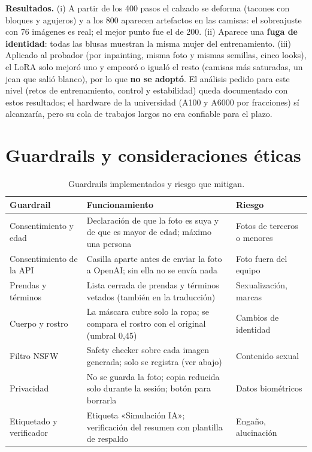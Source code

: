 \documentclass[11pt,letterpaper]{article}
\begin{document}
\textbf{Resultados.} (i) A partir de los 400 pasos el calzado se deforma (tacones con bloques y agujeros) y a los 800
aparecen artefactos en las camisas: el sobreajuste con 76 imágenes es real; el mejor punto fue el de 200. (ii) Aparece una
\textbf{fuga de identidad}: todas las blusas muestran la misma mujer del entrenamiento. (iii) Aplicado al probador (por
inpainting, misma foto y mismas semillas, cinco looks), el LoRA solo mejoró uno y empeoró o igualó el resto (camisas más
saturadas, un jean que salió blanco), por lo que \textbf{no se adoptó}. El análisis pedido para este nivel (retos de
entrenamiento, control y estabilidad) queda documentado con estos resultados; el hardware de la universidad (A100 y
A6000 por fracciones) sí alcanzaría, pero su cola de trabajos largos no era confiable para el plazo.

\section{Guardrails y consideraciones éticas}
\label{sec:etica}

\begin{table}[H]
\centering
\caption{Guardrails implementados y riesgo que mitigan.}
\small
\begin{tabularx}{\textwidth}{@{}p{3.1cm}Lp{3.3cm}@{}}
\toprule
\textbf{Guardrail} & \textbf{Funcionamiento} & \textbf{Riesgo} \\
\midrule
Consentimiento y edad & Declaración de que la foto es suya y de que es mayor de edad; máximo una persona & Fotos de terceros o menores \\
Consentimiento de la API & Casilla aparte antes de enviar la foto a OpenAI; sin ella no se envía nada & Foto fuera del equipo \\
Prendas y términos & Lista cerrada de prendas y términos vetados (también en la traducción) & Sexualización, marcas \\
Cuerpo y rostro & La máscara cubre solo la ropa; se compara el rostro con el original (umbral 0,45) & Cambios de identidad \\
Filtro NSFW & Safety checker sobre cada imagen generada; solo se registra (ver abajo) & Contenido sexual \\
Privacidad & No se guarda la foto; copia reducida solo durante la sesión; botón para borrarla & Datos biométricos \\
Etiquetado y verificador & Etiqueta «Simulación IA»; verificación del resumen con plantilla de respaldo & Engaño, alucinación \\
\bottomrule
\end{tabularx}
\end{table}
\end{document}
